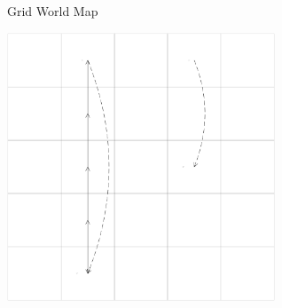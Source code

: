 \documentclass{beamer}
\begin{document}
\begin{frame}{Grid World Map}
	\begin{center}
		\includegraphics[width=8cm]{grid_world_cycle.png}
	\end{center}
\end{frame}
\end{document}
